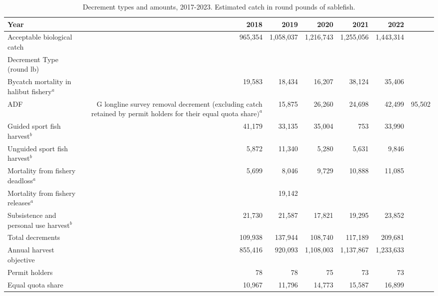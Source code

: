 \documentclass[
]{article}
\begin{document}
\begin{longtable}[t]{lrrrrr}
\caption{\label{tab:decrements}Decrement types and amounts, 2017-2023.  Estimated catch in round pounds of sablefish.}\\
\toprule
Year & 2018 & 2019 & 2020 & 2021 & 2022\\
\midrule
Acceptable biological catch & 965,354 & 1,058,037 & 1,216,743 & 1,255,056 & 1,443,314\\
Decrement Type (round lb) &  &  &  &  & \\
Bycatch mortality in halibut fishery$^a$ & 19,583 & 18,434 & 16,207 & 38,124 & 35,406\\
ADF&G longline survey removal decrement (excluding catch retained by permit holders for their equal quota share$)^a$ & 15,875 & 26,260 & 24,698 & 42,499 & 95,502\\
Guided sport fish harvest$^b$ & 41,179 & 33,135 & 35,004 & 753 & 33,990\\
\addlinespace
Unguided sport fish harvest$^b$ & 5,872 & 11,340 & 5,280 & 5,631 & 9,846\\
Mortality from fishery deadloss$^a$ & 5,699 & 8,046 & 9,729 & 10,888 & 11,085\\
Mortality from fishery releases$^a$ &  & 19,142 &  &  & \\
Subsistence and personal use harvest$^b$ & 21,730 & 21,587 & 17,821 & 19,295 & 23,852\\
Total decrements & 109,938 & 137,944 & 108,740 & 117,189 & 209,681\\
\addlinespace
Annual harvest objective & 855,416 & 920,093 & 1,108,003 & 1,137,867 & 1,233,633\\
Permit holders & 78 & 78 & 75 & 73 & 73\\
Equal quota share & 10,967 & 11,796 & 14,773 & 15,587 & 16,899\\
\bottomrule
\end{longtable}
\end{document}
